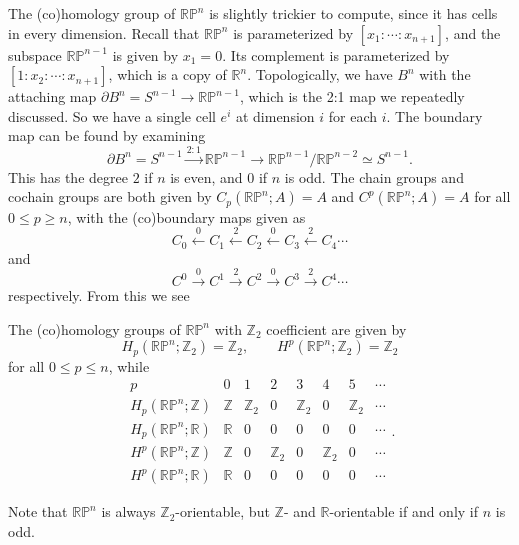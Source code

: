 \documentclass[12pt]{article}
\numberwithin{equation}{section}
\theoremstyle{remark}
\def\bR{\mathbb{R}}
\def\bZ{\mathbb{Z}}
\def\RP{\mathbb{RP}}
\begin{document}
The (co)homology group of $\RP^n$ is slightly trickier to compute,
since it has cells in every dimension.
Recall that $\RP^n$ is parameterized by $[x_1:\cdots:x_{n+1}]$,
and the subspace $\RP^{n-1}$ is given by $x_1=0$.
Its complement is parameterized by $[1:x_2:\cdots:x_{n+1}]$,
which is a copy of $\bR^n$.
Topologically, we have $B^n$ with the attaching map $\partial B^n=S^{n-1}\to \RP^{n-1}$, 
which is the 2:1 map we repeatedly discussed.
So we have a single cell $e^i$ at dimension $i$ for each $i$.
The boundary map can be found by examining \begin{equation}
\partial B^n = S^{n-1} \xrightarrow{2:1} \RP^{n-1} \to \RP^{n-1}/\RP^{n-2} \simeq S^{n-1}.
\end{equation}
This has the degree $2$ if $n$ is even, and $0$ if $n$ is odd.
The chain groups and cochain groups are both given by $C_p(\RP^n;A)=A$ 
and $C^p(\RP^n;A)=A$ for all $0\le p\ge n$, with the (co)boundary maps given as 
\begin{equation}
C_0 \xleftarrow{0} C_1 \xleftarrow{2} C_2 \xleftarrow{0} C_3 \xleftarrow{2} C_4 \cdots
\end{equation}
and 
\begin{equation}
C^0 \xrightarrow{0} C^1 \xrightarrow{2} C^2 \xrightarrow{0} C^3 \xrightarrow{2} C^4 \cdots
\end{equation}
respectively. 
From this we see 
\begin{example}
The (co)homology groups of $\RP^n$ with $\bZ_2$ coefficient are given by \begin{equation}
H_p(\RP^n;\bZ_2) = \bZ_2,\qquad
H^p(\RP^n;\bZ_2) = \bZ_2
\end{equation} for all $0\le p\le n$, while \begin{equation}
\begin{array}{c|ccccccccccccccccc}
  p& 0 &  1 & 2 & 3 & 4 & 5 & \cdots \\
  \hline
  H_p(\RP^n;\bZ) & \bZ & \bZ_2  & 0 & \bZ_2&  0 & \bZ_2 & \cdots \\
  H_p(\RP^n;\bR) & \bR & 0 & 0 & 0 & 0 & 0 & \cdots \\
  H^p(\RP^n;\bZ) & \bZ & 0 & \bZ_2  & 0 & \bZ_2&    0 & \cdots \\
  H^p(\RP^n;\bR) & \bR & 0 & 0 & 0 & 0 & 0 & \cdots 
\end{array} .
\end{equation}
\end{example}

Note that $\RP^n$ is always $\bZ_2$-orientable,
but $\bZ$- and $\bR$-orientable if and only if $n$ is odd.
\end{document}
